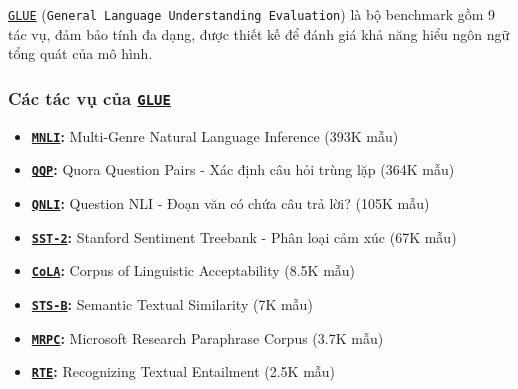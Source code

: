 \hyperref[acro:glue]{\texttt{GLUE}} (\texttt{General Language Understanding Evaluation}) \cite{wang2018glue} là bộ benchmark gồm 9 tác vụ, đảm bảo tính đa dạng, được thiết kế để đánh giá khả năng hiểu ngôn ngữ tổng quát của mô hình.

\subsubsection{Các tác vụ của \hyperref[acro:glue]{\texttt{GLUE}}}
\begin{itemize}
    \item \textbf{\hyperref[acro:mnli]{\texttt{MNLI}}:} Multi-Genre Natural Language Inference (393K mẫu)
    \item \textbf{\hyperref[acro:qqp]{\texttt{QQP}}:} Quora Question Pairs - Xác định câu hỏi trùng lặp (364K mẫu)
    \item \textbf{\hyperref[acro:qnli]{\texttt{QNLI}}:} Question NLI - Đoạn văn có chứa câu trả lời? (105K mẫu)
    \item \textbf{\hyperref[acro:sst2]{\texttt{SST-2}}:} Stanford Sentiment Treebank - Phân loại cảm xúc (67K mẫu)
    \item \textbf{\hyperref[acro:cola]{\texttt{CoLA}}:} Corpus of Linguistic Acceptability (8.5K mẫu)
    \item \textbf{\hyperref[acro:stsb]{\texttt{STS-B}}:} Semantic Textual Similarity (7K mẫu)
    \item \textbf{\hyperref[acro:mrpc]{\texttt{MRPC}}:} Microsoft Research Paraphrase Corpus (3.7K mẫu)
    \item \textbf{\hyperref[acro:rte]{\texttt{RTE}}:} Recognizing Textual Entailment (2.5K mẫu)
\end{itemize}

